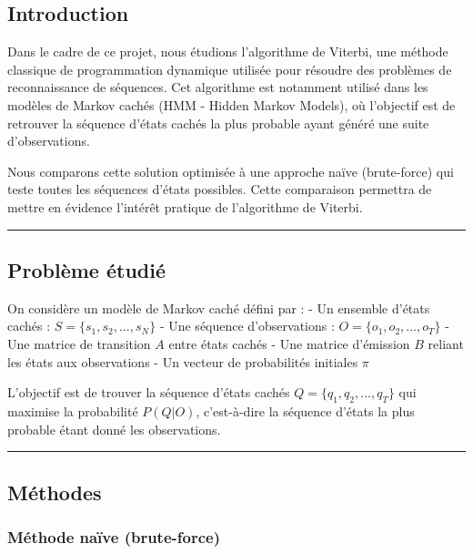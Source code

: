 \documentclass[
]{article}
\begin{document}
\subsection{Introduction}\label{introduction}

Dans le cadre de ce projet, nous étudions l'algorithme de Viterbi, une
méthode classique de programmation dynamique utilisée pour résoudre des
problèmes de reconnaissance de séquences. Cet algorithme est notamment
utilisé dans les modèles de Markov cachés (HMM - Hidden Markov Models),
où l'objectif est de retrouver la séquence d'états cachés la plus
probable ayant généré une suite d'observations.

Nous comparons cette solution optimisée à une approche naïve
(brute-force) qui teste toutes les séquences d'états possibles. Cette
comparaison permettra de mettre en évidence l'intérêt pratique de
l'algorithme de Viterbi.

\begin{center}\rule{0.5\linewidth}{0.5pt}\end{center}

\subsection{Problème étudié}\label{probluxe8me-uxe9tudiuxe9}

On considère un modèle de Markov caché défini par : - Un ensemble
d'états cachés : \(S = \{s_1, s_2, \dots, s_N\}\) - Une séquence
d'observations : \(O = \{o_1, o_2, \dots, o_T\}\) - Une matrice de
transition \(A\) entre états cachés - Une matrice d'émission \(B\)
reliant les états aux observations - Un vecteur de probabilités
initiales \(\pi\)

L'objectif est de trouver la séquence d'états cachés
\(Q = \{q_1, q_2, \dots, q_T\}\) qui maximise la probabilité \(P(Q|O)\),
c'est-à-dire la séquence d'états la plus probable étant donné les
observations.

\begin{center}\rule{0.5\linewidth}{0.5pt}\end{center}

\subsection{Méthodes}\label{muxe9thodes}

\subsubsection{Méthode naïve
(brute-force)}\label{muxe9thode-nauxefve-brute-force}
\end{document}
